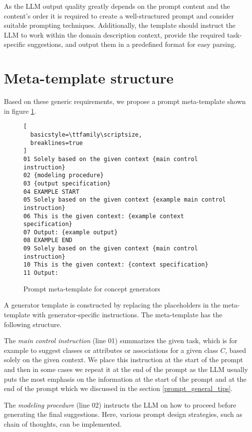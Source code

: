 As the LLM output quality greatly depends on the prompt content and the content's order it is required to create a well-structured prompt and consider suitable prompting techniques. Additionally, the template should instruct the LLM to work within the domain description context, provide the required task-specific suggestions, and output them in a predefined format for easy parsing.


\section{Meta-template structure}

Based on these generic requirements, we propose a prompt meta-template shown in figure \ref{fig:meta-templates}.

\begin{figure}[!h]
    \centering
\begin{lstlisting}[
  basicstyle=\ttfamily\scriptsize,
  breaklines=true
]
01 Solely based on the given context {main control instruction}
02 {modeling procedure}
03 {output specification}
04 EXAMPLE START
05 Solely based on the given context {example main control instruction}
06 This is the given context: {example context specification}
07 Output: {example output}
08 EXAMPLE END
09 Solely based on the given context {main control instruction}
10 This is the given context: {context specification}
11 Output:
\end{lstlisting}
    \caption{\centering Prompt meta-template for concept generators}
    \label{fig:meta-templates}
\end{figure}

A generator template is constructed by replacing the placeholders in the meta-template with generator-specific instructions. The meta-template has the following structure.

The \textit{main control instruction} (line 01) summarizes the given task, which is for example to suggest classes or attributes or associations for a given class $C$, based solely on the given context. We place this instruction at the start of the prompt and then in some cases we repeat it at the end of the prompt as the LLM usually puts the most emphasis on the information at the start of the prompt and at the end of the prompt which we discussed in the section \ref{prompt_general_tips}.

The \textit{modeling procedure} (line 02) instructs the LLM on how to proceed before generating the final suggestions. Here, various prompt design strategies, such as chain of thoughts, can be implemented.

